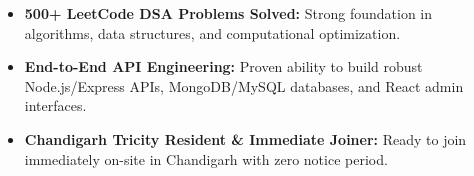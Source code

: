 \documentclass[a4paper,10pt]{article}
\begin{document}
\begin{itemize}

    \item \textbf{500+ LeetCode DSA Problems Solved:} Strong foundation in algorithms, data structures, and computational optimization.

    \item \textbf{End-to-End API Engineering:} Proven ability to build robust Node.js/Express APIs, MongoDB/MySQL databases, and React admin interfaces.

    \item \textbf{Chandigarh Tricity Resident \& Immediate Joiner:} Ready to join immediately on-site in Chandigarh with zero notice period.

\end{itemize}

\end{document}
